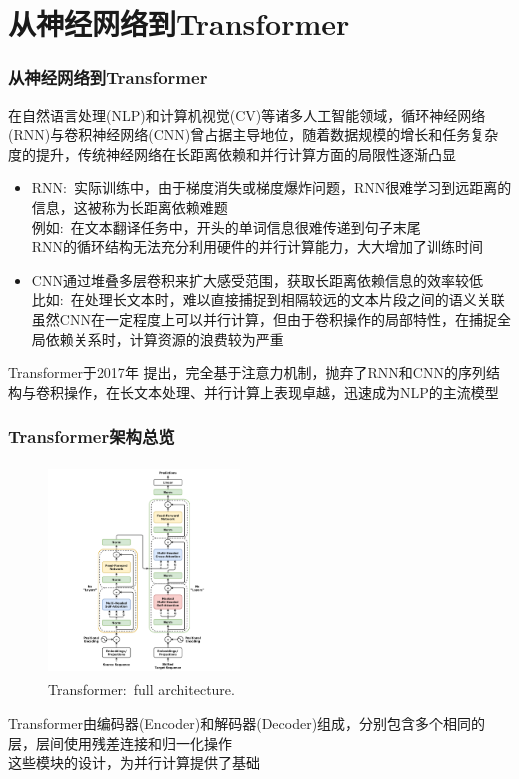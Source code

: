 \section{从神经网络到\rm{Transformer}}
\begin{frame}
	\frametitle{从神经网络到\textrm{Transformer}}
    在自然语言处理\textrm{(NLP)}和计算机视觉\textrm{(CV)}等诸多人工智能领域，循环神经网络\textrm{(RNN)}与卷积神经网络\textrm{(CNN)}曾占据主导地位，随着数据规模的增长和任务复杂度的提升，传统神经网络在长距离依赖和并行计算方面的局限性逐渐凸显
    \begin{itemize}
	    \item \textrm{RNN}:~实际训练中，由于梯度消失或梯度爆炸问题，RNN很难学习到远距离的信息，这被称为长距离依赖难题\\
		    例如:~在文本翻译任务中，开头的单词信息很难传递到句子末尾\\
		    \textrm{RNN}的循环结构无法充分利用硬件的并行计算能力，大大增加了训练时间
	    \item \textrm{CNN}通过堆叠多层卷积来扩大感受范围，获取长距离依赖信息的效率较低\\
		    比如:~在处理长文本时，难以直接捕捉到相隔较远的文本片段之间的语义关联\\
		    虽然\textrm{CNN}在一定程度上可以并行计算，但由于卷积操作的局部特性，在捕捉全局依赖关系时，计算资源的浪费较为严重
    \end{itemize}
    Transformer于\textrm{2017}年%
    提出，完全基于注意力机制，抛弃了\textrm{RNN}和\textrm{CNN}的序列结构与卷积操作，在长文本处理、并行计算上表现卓越，迅速成为\textrm{NLP}的主流模型
\end{frame}


\begin{frame}
	\frametitle{\textrm{Transformer}架构总览}
\begin{figure}[h!]
\centering
\includegraphics[height=2.2in, width=2.0in, viewport=300 0 1200 1500,clip]{Figures/Transformer_full_architecture.png}
\caption{\tiny \textrm{Transformer:~full architecture.}}%
\label{Transformer_full_architecture}
\end{figure}
    \textrm{Transformer}由编码器\textrm{(Encoder)}和解码器\textrm{(Decoder)}组成，分别包含多个相同的层，层间使用残差连接和归一化操作\\
    这些模块的设计，为并行计算提供了基础
\end{frame}

